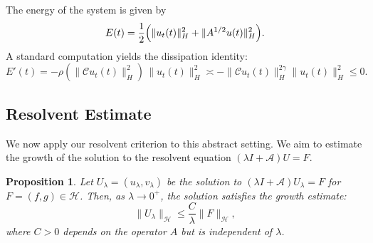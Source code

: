 \documentclass[11pt,reqno]{amsart}
\newtheorem{proposition}[theorem]{Proposition}
\theoremstyle{remark}
\begin{document}
The energy of the system is given by
\[
E(t)=\frac12\Bigl(\|u_t(t)\|_H^2+\|A^{1/2}u(t)\|_H^2\Bigr).
\]
A standard computation yields the dissipation identity:
\begin{equation}\label{eq:diss_nonlocal}
E'(t)= -\rho(\|\mathcal C u_t(t)\|_H^2)\,\|u_t(t)\|_H^2 \asymp -\|\mathcal C u_t(t)\|_H^{2\gamma} \|u_t(t)\|_H^2 \le 0.
\end{equation}

\subsection{Resolvent Estimate}

We now apply our resolvent criterion to this abstract setting. We aim to estimate the growth of the solution to the resolvent equation $(\lambda I + \mathcal{A})U = F$.

\begin{proposition}\label{prop:resolvent_app3}
Let $U_\lambda=(u_\lambda, v_\lambda)$ be the solution to $(\lambda I + \mathcal{A})U_\lambda = F$ for $F=(f,g) \in \mathcal{H}$. Then, as $\lambda \to 0^+$, the solution satisfies the growth estimate:
\[
\|U_\lambda\|_{\mathcal H} \le \frac{C}{\lambda} \|F\|_{\mathcal H},
\]
where $C > 0$ depends on the operator $A$ but is independent of $\lambda$.
\end{proposition}
\end{document}
